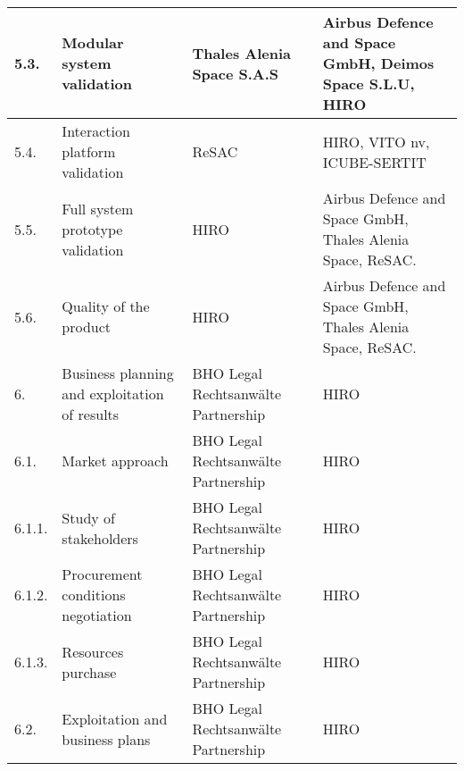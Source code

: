 \begin{longtable}[H]{p{1.5cm} >{\raggedright\arraybackslash}p{4cm} >{\raggedright\arraybackslash}p{3.8cm} >{\raggedright\arraybackslash}p{4cm}}
	\midrule
	
	5.3. & Modular system validation & Thales Alenia Space S.A.S & Airbus Defence and Space GmbH, Deimos Space S.L.U, HIRO\vspace{0.2cm} \\
	
	\midrule
	
	5.4. & Interaction platform validation & ReSAC & HIRO, VITO nv, ICUBE-SERTIT\vspace{0.2cm} \\
	
	\midrule
	
	5.5. & Full system prototype validation & HIRO & Airbus Defence and Space GmbH, Thales Alenia Space, ReSAC.\vspace{0.2cm} \\
	
	\midrule
	
	5.6. & Quality of the product & HIRO & Airbus Defence and Space GmbH, Thales Alenia Space, ReSAC.\vspace{0.2cm} \\
	
	\midrule
	
	6. & Business planning and exploitation of results & BHO Legal Rechtsanwälte Partnership & HIRO\vspace{0.2cm} \\
	
	\midrule
	
	6.1. & Market approach & BHO Legal Rechtsanwälte Partnership & HIRO\vspace{0.2cm} \\
	
	\midrule
	
	6.1.1. & Study of stakeholders & BHO Legal Rechtsanwälte Partnership & HIRO\vspace{0.2cm} \\
	
	\midrule
	
	6.1.2. & Procurement conditions negotiation & BHO Legal Rechtsanwälte Partnership & HIRO\vspace{0.2cm} \\
	
	\midrule
	
	6.1.3. & Resources purchase & BHO Legal Rechtsanwälte Partnership & HIRO\vspace{0.2cm} \\
	
	\midrule
	
	6.2. & Exploitation and business plans & BHO Legal Rechtsanwälte Partnership & HIRO\vspace{0.2cm} \\
	

\end{longtable}
